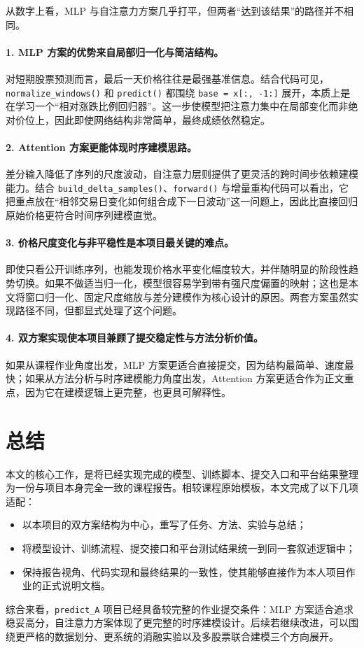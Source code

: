 从数字上看，MLP 与自注意力方案几乎打平，但两者“达到该结果”的路径并不相同。

\paragraph{1. MLP 方案的优势来自局部归一化与简洁结构。}
对短期股票预测而言，最后一天价格往往是最强基准信息。结合代码可见，\texttt{normalize\_windows()} 和 \texttt{predict()} 都围绕 \texttt{base = x[:, -1:]} 展开，本质上是在学习一个“相对涨跌比例回归器”。这一步使模型把注意力集中在局部变化而非绝对价位上，因此即使网络结构非常简单，最终成绩依然稳定。

\paragraph{2. Attention 方案更能体现时序建模思路。}
差分输入降低了序列的尺度波动，自注意力层则提供了更灵活的跨时间步依赖建模能力。结合 \texttt{build\_delta\_samples()}、\texttt{forward()} 与增量重构代码可以看出，它把重点放在“相邻交易日变化如何组合成下一日波动”这一问题上，因此比直接回归原始价格更符合时间序列建模直觉。

\paragraph{3. 价格尺度变化与非平稳性是本项目最关键的难点。}
即使只看公开训练序列，也能发现价格水平变化幅度较大，并伴随明显的阶段性趋势切换。如果不做适当归一化，模型很容易学到带有强尺度偏置的映射；这也是本文将窗口归一化、固定尺度缩放与差分建模作为核心设计的原因。两套方案虽然实现路径不同，但都显式处理了这个问题。

\paragraph{4. 双方案实现使本项目兼顾了提交稳定性与方法分析价值。}
如果从课程作业角度出发，MLP 方案更适合直接提交，因为结构最简单、速度最快；如果从方法分析与时序建模能力角度出发，Attention 方案更适合作为正文重点，因为它在建模逻辑上更完整，也更具可解释性。

\section{总结}

本文的核心工作，是将已经实现完成的模型、训练脚本、提交入口和平台结果整理为一份与项目本身完全一致的课程报告。相较课程原始模板，本文完成了以下几项适配：
\begin{itemize}
    \item 以本项目的双方案结构为中心，重写了任务、方法、实验与总结；
    \item 将模型设计、训练流程、提交接口和平台测试结果统一到同一套叙述逻辑中；
    \item 保持报告视角、代码实现和最终结果的一致性，使其能够直接作为本人项目作业的正式说明文档。
\end{itemize}

综合来看，\texttt{predict\_A} 项目已经具备较完整的作业提交条件：MLP 方案适合追求稳妥高分，自注意力方案体现了更完整的时序建模设计。后续若继续改进，可以围绕更严格的数据划分、更系统的消融实验以及多股票联合建模三个方向展开。
